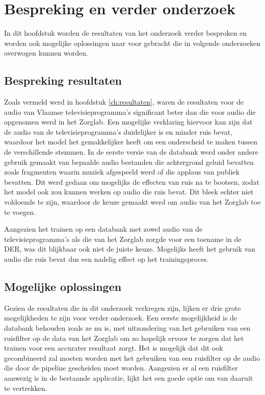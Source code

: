 
\chapter{Bespreking en verder onderzoek}
\label{ch:bespreking}
In dit hoofdstuk worden de resultaten van het onderzoek verder besproken en worden ook mogelijke oplossingen naar voor gebracht die in volgende onderzoeken overwogen kunnen worden.

\section{Bespreking resultaten}
\label{sec:bespr-res}
Zoals vermeld werd in hoofdstuk \ref{ch:resultaten}, waren de resultaten voor de audio van Vlaamse televisieprogramma's significant beter dan die voor audio die opgenomen werd in het Zorglab. Een mogelijke verklaring hiervoor kan zijn dat de audio van de televisieprogramma's duidelijker is en minder ruis bevat, waardoor het model het gemakkelijker heeft om een onderscheid te maken tussen de verschillende stemmen. In de eerste versie van de databank werd onder andere gebruik gemaakt van bepaalde audio bestanden die achtergrond geluid bevatten zoals fragmenten waarin muziek afgespeeld werd of die applaus van publiek bevatten. Dit werd gedaan om mogelijks de effecten van ruis na te bootsen, zodat het model ook zou kunnen werken op audio die ruis bevat. Dit bleek echter niet voldoende te zijn, waardoor de keuze gemaakt werd om audio van het Zorglab toe te voegen.

Aangezien het trainen op een databank met zowel audio van de televisieprogramma's als die van het Zorglab zorgde voor een toename in de DER, was dit blijkbaar ook niet de juiste keuze. Mogelijks heeft het gebruik van audio die ruis bevat dus een nadelig effect op het trainingsproces. 

\section{Mogelijke oplossingen}
\label{sec:opl}
Gezien de resultaten die in dit onderzoek verkregen zijn, lijken er drie grote mogelijkheden te zijn voor verder onderzoek. Een eerste mogelijkheid is de databank behouden zoals ze nu is, met uitzondering van het gebruiken van een ruisfilter op de data van het Zorglab om zo hopelijk ervoor te zorgen dat het trainen voor een accurater resultaat zorgt. Het is mogelijk dat dit ook gecombineerd zal moeten worden met het gebruiken van een ruisfilter op de audio die door de pipeline gescheiden moet worden. Aangezien er al een ruisfilter aanwezig is in de bestaande applicatie, lijkt het een goede optie om van daaruit te vertrekken.

